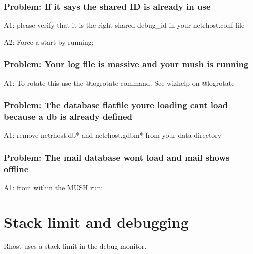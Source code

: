 \documentclass[letterpaper,10pt,english]{sphinxmanual}
\begin{document}
\subsubsection{Problem: If it says the shared ID is already in use}
\label{\detokenize{troubleshooting:problem-if-it-says-the-shared-id-is-already-in-use}}
\sphinxAtStartPar
A1: please verify that it is the right shared debug\_id in your netrhost.conf file

\sphinxAtStartPar
A2: Force a start by running:

\begin{sphinxVerbatim}[commandchars=\\\{\}]
 
\end{sphinxVerbatim}


\subsubsection{Problem: Your log file is massive and your mush is running}
\label{\detokenize{troubleshooting:problem-your-log-file-is-massive-and-your-mush-is-running}}
\sphinxAtStartPar
A1: To rotate this use the @logrotate command. See wizhelp on @logrotate


\subsubsection{Problem: The database flatfile you\textquotesingle{}re loading can\textquotesingle{}t load because a db is already defined}
\label{\detokenize{troubleshooting:problem-the-database-flatfile-you-re-loading-can-t-load-because-a-db-is-already-defined}}
\sphinxAtStartPar
A1: remove netrhost.db* and netrhost.gdbm* from your data directory


\subsubsection{Problem: The mail database won\textquotesingle{}t load and mail shows \textquotesingle{}offline\textquotesingle{}}
\label{\detokenize{troubleshooting:problem-the-mail-database-won-t-load-and-mail-shows-offline}}
\sphinxAtStartPar
A1: from within the MUSH run:

\begin{sphinxVerbatim}[commandchars=\\\{\}]
\end{sphinxVerbatim}


\section{Stack limit and debugging}
\label{\detokenize{troubleshooting:stack-limit-and-debugging}}
\sphinxAtStartPar
Rhost uses a stack limit in the debug monitor.
\end{document}
